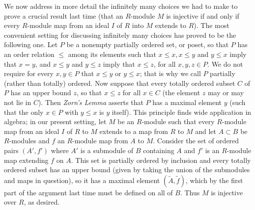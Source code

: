 We now address in more detail the infinitely many choices we had to make to prove a crucial result last time (that an $R$-module $M$ is injective if and only if every $R$-module map from an ideal $I$ of $R$ into $M$ extends to $R$).  The most convenient setting for discussing infinitely many choices has proved to be the following one.  Let $P$ be a nonempty partially ordered set, or poset, so that
$P$ has an order relation $\le$ among its elements such that $x\le x, x\le y$ and $y\le x$ imply that
$x=y$, and $x\le y$ and $y\le z$ imply that $x\le z$, for all $x,y,z\in P$.  We do not require for every $x,y\in P$ that $x\le y$ or $y\le x$; that is why we call $P$ partially (rather than totally) ordered.  Now suppose that every totally ordered subset $C$ of $P$ has an upper bound $z$, so that $x\le z$ for all $x\in C$ (the element $z$ may or may not lie in $C$).  Then {\sl Zorn's Lemma} asserts that $P$ has a maximal element $y$ (such that the only $x\in P$ with $y\le x$ is $y$ itself).  This principle finds wide application in algebra; in our present setting, let $M$ be an $R$-module such that every $R$-module map from an ideal $I$ of $R$ to $M$ extends to a map from $R$ to $M$ and let $A\subset B$ be $R$-modules and $f$ an $R$-module map from $A$ to $M$.  Consider the set of ordered pairs
$(A',f')$ where $A'$ is a submodule of $B$ containing $A$ and $f'$ is an $R$-module map extending $f$ on $A$.  This set is partially ordered by inclusion and every totally ordered subset has an upper bound (given by taking the union of the submodules and maps in question), so it has a maximal element $(\tilde A,\tilde f)$, which by the first part of the argument last time must be defined on all of $B$.  Thus $M$ is injective over $R$, as desired.

